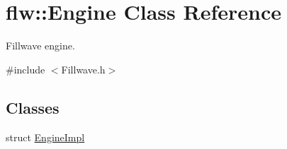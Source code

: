 \hypertarget{classflw_1_1Engine}{}\section{flw\+:\+:Engine Class Reference}
\label{classflw_1_1Engine}


Fillwave engine.  




{\ttfamily \#include $<$Fillwave.\+h$>$}

\subsection*{Classes}
\begin{DoxyCompactItemize}
\item 
struct \hyperlink{structflw_1_1Engine_1_1EngineImpl}{Engine\+Impl}
\end{DoxyCompactItemize}
